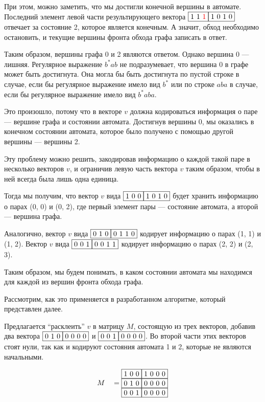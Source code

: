 \begin{example}
При этом, можно заметить, что мы достигли конечной вершины в автомате. Последний элемент левой части результирующего
вектора $\fbox{1 1 \textcolor{red}{1}} \fbox{1 0 1 0}$ отвечает за состояние 2, которое является конечным. А значит, обход необходимо остановить, и текущие вершины фронта
обхода графа записать в ответ.

Таким образом, вершины графа 0 и 2 являются ответом. Однако вершина 0 --- лишняя. Регулярное выражение $b^*ab$ не подразумевает, что
вершина 0 в графе может быть достигнута. Она могла бы быть достигнута по пустой строке в случае, если бы регулярное выражение имело вид $b^*$ или
по строке $aba$ в случае, если бы регулярное выражение имело вид $b^*aba$.

Это произошло, потому что в векторе $v$ должна кодироваться информация о паре --- вершине графа и состоянии автомата.
Достигнув вершины 0, мы оказались в конечном состоянии автомата, которое было получено с помощью другой вершины --- вершины 2.

Эту проблему можно решить, закодировав информацию о каждой такой паре в несколько векторов $v$, и ограничив левую
часть вектора $v$ таким образом, чтобы в ней всегда была лишь одна единица.

Тогда мы получим, что вектор $v$ вида $\fbox{1 0 0} \fbox{1 0 1 0}$ будет хранить информацию о парах (0, 0) и (0, 2),
где первый элемент пары --- состояние автомата, а второй --- вершина графа.

Аналогично, вектор $v$ вида $\fbox{0 1 0} \fbox{0 1 1 0}$ кодирует информацию о парах (1, 1) и (1, 2).
Вектор $v$ вида $\fbox{0 0 1} \fbox{0 0 1 1}$ кодирует информацию о парах (2, 2) и (2, 3).

Таким образом, мы будем понимать, в каком состоянии автомата мы находимся для каждой из вершин фронта обхода графа.

Рассмотрим, как это применяется в разработанном алгоритме, который представлен далее.

Предлагается ``расклеить'' $v$ в матрицу $M$, состоящую из трех векторов, добавив два вектора $\fbox{0 1 0} \fbox{0 0 0 0}$ и $\fbox{0 0 1} \fbox{0 0 0 0}$.
Во второй части этих векторов стоят нули, так как  и  кодируют состояния автомата 1 и 2, которые не являются начальными.

\begin{alignat*}{7}
  & &&M &&=\begin{matrix}
    \fbox{1 0 0} \fbox{1 0 0 0} \\ 
    \fbox{0 1 0} \fbox{0 0 0 0} \\
    \fbox{0 0 1} \fbox{0 0 0 0}
        \end{matrix}
\end{alignat*}


\end{example}
